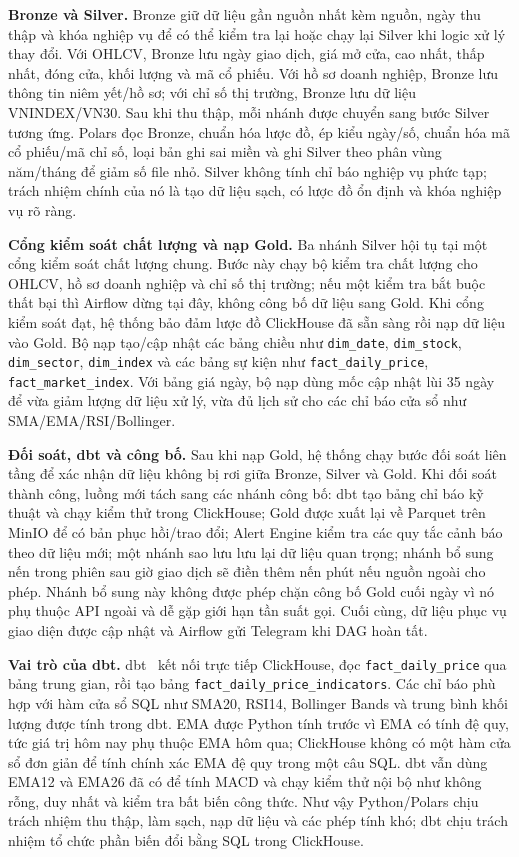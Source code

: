 \documentclass[conference,a4paper]{IEEEtran}
\newcommand{\code}[1]{\texttt{#1}}
\begin{document}
\textbf{Bronze và Silver.} Bronze giữ dữ liệu gần nguồn nhất kèm nguồn, ngày thu thập và khóa nghiệp vụ để có thể kiểm tra lại hoặc chạy lại Silver khi logic xử lý thay đổi. Với OHLCV, Bronze lưu ngày giao dịch, giá mở cửa, cao nhất, thấp nhất, đóng cửa, khối lượng và mã cổ phiếu. Với hồ sơ doanh nghiệp, Bronze lưu thông tin niêm yết/hồ sơ; với chỉ số thị trường, Bronze lưu dữ liệu VNINDEX/VN30. Sau khi thu thập, mỗi nhánh được chuyển sang bước Silver tương ứng. Polars đọc Bronze, chuẩn hóa lược đồ, ép kiểu ngày/số, chuẩn hóa mã cổ phiếu/mã chỉ số, loại bản ghi sai miền và ghi Silver theo phân vùng năm/tháng để giảm số file nhỏ. Silver không tính chỉ báo nghiệp vụ phức tạp; trách nhiệm chính của nó là tạo dữ liệu sạch, có lược đồ ổn định và khóa nghiệp vụ rõ ràng.

\textbf{Cổng kiểm soát chất lượng và nạp Gold.} Ba nhánh Silver hội tụ tại một cổng kiểm soát chất lượng chung. Bước này chạy bộ kiểm tra chất lượng cho OHLCV, hồ sơ doanh nghiệp và chỉ số thị trường; nếu một kiểm tra bắt buộc thất bại thì Airflow dừng tại đây, không công bố dữ liệu sang Gold. Khi cổng kiểm soát đạt, hệ thống bảo đảm lược đồ ClickHouse đã sẵn sàng rồi nạp dữ liệu vào Gold. Bộ nạp tạo/cập nhật các bảng chiều như \code{dim\_date}, \code{dim\_stock}, \code{dim\_sector}, \code{dim\_index} và các bảng sự kiện như \code{fact\_daily\_price}, \code{fact\_market\_index}. Với bảng giá ngày, bộ nạp dùng mốc cập nhật lùi 35 ngày để vừa giảm lượng dữ liệu xử lý, vừa đủ lịch sử cho các chỉ báo cửa sổ như SMA/EMA/RSI/Bollinger.

\textbf{Đối soát, dbt và công bố.} Sau khi nạp Gold, hệ thống chạy bước đối soát liên tầng để xác nhận dữ liệu không bị rơi giữa Bronze, Silver và Gold. Khi đối soát thành công, luồng mới tách sang các nhánh công bố: dbt tạo bảng chỉ báo kỹ thuật và chạy kiểm thử trong ClickHouse; Gold được xuất lại về Parquet trên MinIO để có bản phục hồi/trao đổi; Alert Engine kiểm tra các quy tắc cảnh báo theo dữ liệu mới; một nhánh sao lưu lưu lại dữ liệu quan trọng; nhánh bổ sung nến trong phiên sau giờ giao dịch sẽ điền thêm nến phút nếu nguồn ngoài cho phép. Nhánh bổ sung này không được phép chặn công bố Gold cuối ngày vì nó phụ thuộc API ngoài và dễ gặp giới hạn tần suất gọi. Cuối cùng, dữ liệu phục vụ giao diện được cập nhật và Airflow gửi Telegram khi DAG hoàn tất.

\textbf{Vai trò của dbt.} dbt~\cite{dbt} kết nối trực tiếp ClickHouse, đọc \code{fact\_daily\_price} qua bảng trung gian, rồi tạo bảng \code{fact\_daily\_price\_indicators}. Các chỉ báo phù hợp với hàm cửa sổ SQL như SMA20, RSI14, Bollinger Bands và trung bình khối lượng được tính trong dbt. EMA được Python tính trước vì EMA có tính đệ quy, tức giá trị hôm nay phụ thuộc EMA hôm qua; ClickHouse không có một hàm cửa sổ đơn giản để tính chính xác EMA đệ quy trong một câu SQL. dbt vẫn dùng EMA12 và EMA26 đã có để tính MACD và chạy kiểm thử nội bộ như không rỗng, duy nhất và kiểm tra bất biến công thức. Như vậy Python/Polars chịu trách nhiệm thu thập, làm sạch, nạp dữ liệu và các phép tính khó; dbt chịu trách nhiệm tổ chức phần biến đổi bằng SQL trong ClickHouse.
\end{document}
